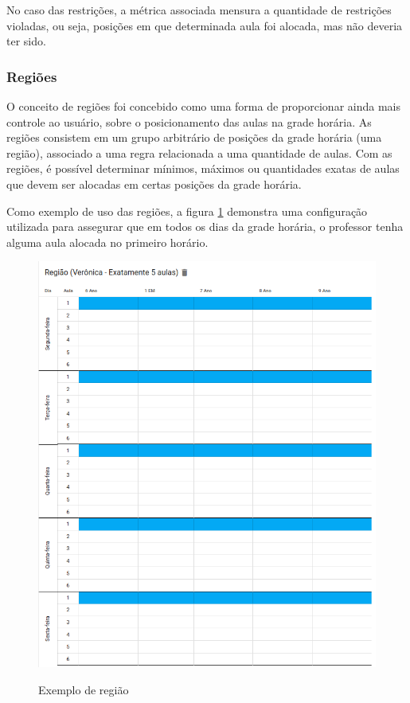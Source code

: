 No caso das restrições, a métrica associada mensura a quantidade de restrições violadas, ou seja, posições em que determinada aula foi alocada, mas não deveria ter sido.

\subsubsection{Regiões}

O conceito de regiões foi concebido como uma forma de proporcionar ainda mais controle ao usuário, sobre o posicionamento das aulas na grade horária. As regiões consistem em um grupo arbitrário de posições da grade horária (uma região), associado a uma regra relacionada a uma quantidade de aulas. Com as regiões, é possível determinar mínimos, máximos ou quantidades exatas de aulas que devem ser alocadas em certas posições da grade horária.

Como exemplo de uso das regiões, a figura \ref{fig:regioes} demonstra uma configuração utilizada para assegurar que em todos os dias da grade horária, o professor tenha alguma aula alocada no primeiro horário.

\begin{figure}[!htb]
	\centering
	\caption{Exemplo de região}
	\includegraphics[width=1\textwidth]{./dados/figuras/regioes}
	\label{fig:regioes}
\end{figure}
\pagebreak

